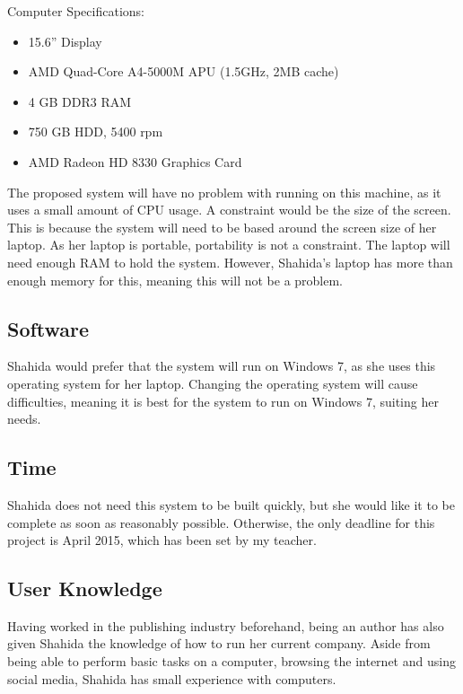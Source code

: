 Computer Specifications:

\begin{itemize}
    \item 15.6” Display
    \item AMD Quad-Core A4-5000M APU (1.5GHz, 2MB cache)
    \item 4 GB DDR3 RAM
    \item 750 GB HDD, 5400 rpm
    \item AMD Radeon HD 8330 Graphics Card
\end{itemize}

The proposed system will have no problem with running on this machine, as it uses a small amount of CPU usage. A constraint would be the size of the screen. This is because the system will need to be based around the screen size of her laptop. As her laptop is portable, portability is not a constraint. The laptop will need enough RAM to hold the system. However, Shahida's laptop has more than enough memory for this, meaning this will not be a problem. 

\subsection{Software}

Shahida would prefer that the system will run on Windows 7, as she uses this operating system for her laptop. Changing the operating system will cause difficulties, meaning it is best for the system to run on Windows 7, suiting her needs.

\subsection{Time}

Shahida does not need this system to be built quickly, but she would like it to be complete as soon as reasonably possible. Otherwise, the only deadline for this project is April 2015, which has been set by my teacher.

\subsection{User Knowledge}

Having worked in the publishing industry beforehand, being an author has also given Shahida the knowledge of how to run her current company. Aside from being able to perform basic tasks on a computer, browsing the internet and using social media, Shahida has small experience with computers.

